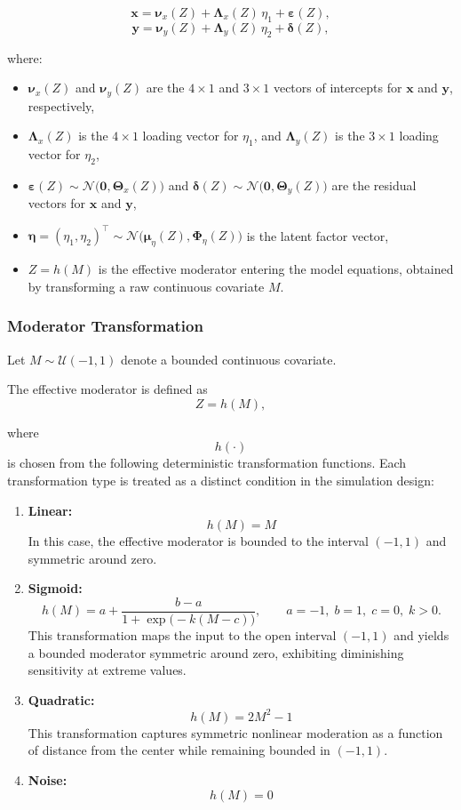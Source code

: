 \documentclass[
  man,
  floatsintext]{apa7}
\providecommand{\tightlist}{%
  \setlength{\itemsep}{0pt}\setlength{\parskip}{0pt}}
\begin{document}
\[
\mathbf{x} = \boldsymbol{\nu}_x(Z) + \boldsymbol{\Lambda}_x(Z)\,\eta_1 + \boldsymbol{\varepsilon}(Z),
\] \[
\mathbf{y} = \boldsymbol{\nu}_y(Z) + \boldsymbol{\Lambda}_y(Z)\,\eta_2 + \boldsymbol{\delta}(Z),
\]

where:

\begin{itemize}
\tightlist
\item
  \(\boldsymbol{\nu}_x(Z)\) and \(\boldsymbol{\nu}_y(Z)\) are the
  \(4 \times 1\) and \(3 \times 1\) vectors of intercepts for
  \(\mathbf{x}\) and \(\mathbf{y}\), respectively,
\item
  \(\boldsymbol{\Lambda}_x(Z)\) is the \(4 \times 1\) loading vector for
  \(\eta_1\), and \(\boldsymbol{\Lambda}_y(Z)\) is the \(3 \times 1\)
  loading vector for \(\eta_2\),
\item
  \(\boldsymbol{\varepsilon}(Z) \sim \mathcal{N}\bigl(\mathbf{0}, \boldsymbol{\Theta}_x(Z)\bigr)\)
  and
  \(\boldsymbol{\delta}(Z) \sim \mathcal{N}\bigl(\mathbf{0}, \boldsymbol{\Theta}_y(Z)\bigr)\)
  are the residual vectors for \(\mathbf{x}\) and \(\mathbf{y}\),
\item
  \(\boldsymbol{\eta} = (\eta_1, \eta_2)^\top \sim \mathcal{N}\bigl(\boldsymbol{\mu}_\eta(Z), \boldsymbol{\Phi}_\eta(Z)\bigr)\)
  is the latent factor vector,
\item
  \(Z = h(M)\) is the effective moderator entering the model equations,
  obtained by transforming a raw continuous covariate \(M\).
\end{itemize}

\subsubsection{Moderator
Transformation}\label{moderator-transformation-1}

Let \(M \sim \mathcal{U}(-1,1)\) denote a bounded continuous covariate.

The effective moderator is defined as \[
Z = h(M),
\]

where \[h(\cdot)\] is chosen from the following deterministic
transformation functions. Each transformation type is treated as a
distinct condition in the simulation design:

\begin{enumerate}
\def\labelenumi{\arabic{enumi}.}
\item
  \textbf{Linear:} \[
  h(M) = M
  \] In this case, the effective moderator is bounded to the interval
  \((-1,1)\) and symmetric around zero.
\item
  \textbf{Sigmoid:} \[
  h(M) = a + \frac{b-a}{1 + \exp\!\bigl(-k(M-c)\bigr)},
  \qquad a=-1,\; b=1,\; c=0,\; k>0.
  \] This transformation maps the input to the open interval \((-1, 1)\)
  and yields a bounded moderator symmetric around zero, exhibiting
  diminishing sensitivity at extreme values.
\item
  \textbf{Quadratic:} \[
  h(M) = 2M^2 - 1
  \] This transformation captures symmetric nonlinear moderation as a
  function of distance from the center while remaining bounded in
  \((-1,1)\).
\item
  \textbf{Noise:} \[
  h(M) = 0
  \]
\end{enumerate}
\end{document}
